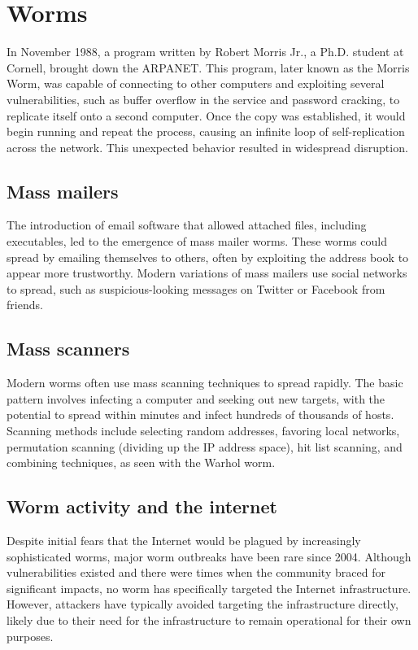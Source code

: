 \section{Worms}

In November 1988, a program written by Robert Morris Jr., a Ph.D. student at Cornell, brought down the ARPANET.
This program, later known as the Morris Worm, was capable of connecting to other computers and exploiting several vulnerabilities, such as buffer overflow in the service and password cracking, to replicate itself onto a second computer. 
Once the copy was established, it would begin running and repeat the process, causing an infinite loop of self-replication across the network. 
This unexpected behavior resulted in widespread disruption.

\subsection{Mass mailers}
The introduction of email software that allowed attached files, including executables, led to the emergence of mass mailer worms. 
These worms could spread by emailing themselves to others, often by exploiting the address book to appear more trustworthy. 
Modern variations of mass mailers use social networks to spread, such as suspicious-looking messages on Twitter or Facebook from friends.

\subsection{Mass scanners}
Modern worms often use mass scanning techniques to spread rapidly. 
The basic pattern involves infecting a computer and seeking out new targets, with the potential to spread within minutes and infect hundreds of thousands of hosts. 
Scanning methods include selecting random addresses, favoring local networks, permutation scanning (dividing up the IP address space), hit list scanning, and combining techniques, as seen with the Warhol worm.

\subsection{Worm activity and the internet}
Despite initial fears that the Internet would be plagued by increasingly sophisticated worms, major worm outbreaks have been rare since 2004. 
Although vulnerabilities existed and there were times when the community braced for significant impacts, no worm has specifically targeted the Internet infrastructure. 
However, attackers have typically avoided targeting the infrastructure directly, likely due to their need for the infrastructure to remain operational for their own purposes.